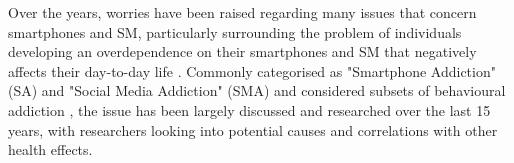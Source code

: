 \documentclass[12pt]{article}
\begin{document}

Over the years, worries have been raised regarding many issues that concern smartphones and 
SM, particularly surrounding the problem of individuals developing an overdependence on their smartphones 
and SM that negatively affects their day-to-day life 
\autocite{RefWorks:RefID:133-allen2020social, RefWorks:RefID:134-primack2017social}.
Commonly categorised as "Smartphone Addiction" (SA) and "Social Media Addiction" (SMA) and considered 
subsets of behavioural addiction 
\autocite{RefWorks:RefID:68-king2017impact, RefWorks:RefID:66-hou2019social}, the issue has been largely discussed 
and researched over the last 15 years, with researchers looking into potential causes and 
correlations with other health effects.\newline


\end{document}
